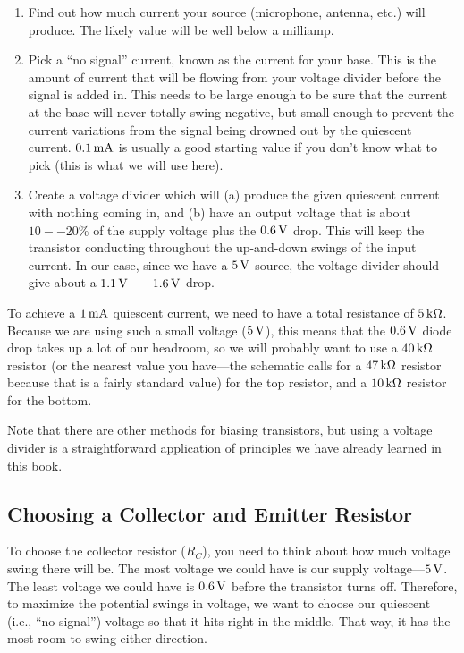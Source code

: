 \begin{enumerate}
\item Find out how much current your source (microphone, antenna, etc.) will produce.  The likely value will be well below a milliamp.
\item Pick a ``no signal'' current, known as the  current for your base.  This is the amount of current that will be flowing from your voltage divider before the signal is added in.  This needs to be large enough to be sure that the current at the base will never totally swing negative, but small enough to prevent the current variations from the signal being drowned out by the quiescent current.  $0.1\,\si{\milli\ampere}$ is usually a good starting value if you don't know what to pick (this is what we will use here).
\item Create a voltage divider which will (a) produce the given quiescent current with nothing coming in, and (b) have an output voltage that is about $10--20\%$ of the supply voltage plus the $0.6\,\si{\volt}$ drop. This will keep the transistor conducting throughout the up-and-down swings of the input current.  In our case, since we have a $5\,\si{\volt}$ source, the voltage divider should give about a $1.1\,\si{\volt}--1.6\,\si{\volt}$ drop.
\end{enumerate}

To achieve a $1\,\si{\milli\ampere}$ quiescent current, we need to have a total resistance of $5\,\si{\kilo\ohm}$.
Because we are using such a small voltage ($5\,\si{\volt}$), this means that the $0.6\,\si{\volt}$ diode drop takes up a lot of our headroom, so we will probably want to use a $40\,\si{\kilo\ohm}$ resistor (or the nearest value you have---the schematic calls for a $47\,\si{\kilo\ohm}$ resistor because that is a fairly standard value) for the top resistor, and a $10\,\si{\kilo\ohm}$ resistor for the bottom.

Note that there are other methods for biasing transistors, but using a voltage divider is a straightforward application of principles we have already learned in this book.

\subsection{Choosing a Collector and Emitter Resistor}

To choose the collector resistor ($R_C$), you need to think about how much voltage swing there will be.
The most voltage we could have is our supply voltage---$5\,\si{\volt}$.
The least voltage we could have is $0.6\,\si{\volt}$ before the transistor turns off.
Therefore, to maximize the potential swings in voltage, we want to choose our quiescent (i.e., ``no signal'') voltage so that it hits right in the middle. 
That way, it has the most room to swing either direction.

